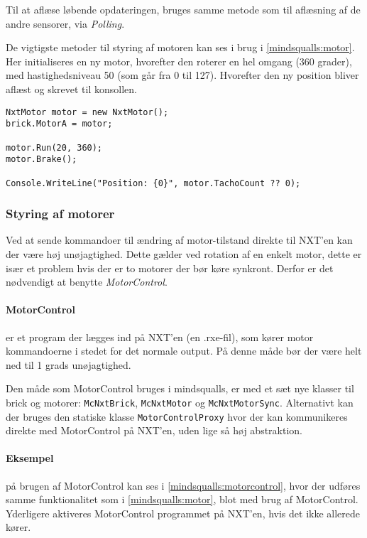 Til at aflæse løbende opdateringen, bruges samme metode som til aflæsning af de andre sensorer, via \textit{Polling}.

De vigtigste metoder til styring af motoren kan ses i brug i \cref{mindsqualls:motor}.
Her initialiseres en ny motor, hvorefter den roterer en hel omgang (360 grader), med hastighedsniveau 50 (som går fra 0 til 127).
Hvorefter den ny position bliver aflæst og skrevet til konsollen.

\begin{lstlisting}[style=csharpsmall,caption={Et eksempel på brug af en motor i \mindsqualls},label=mindsqualls:motor]
NxtMotor motor = new NxtMotor();
brick.MotorA = motor;

motor.Run(20, 360);
motor.Brake();

Console.WriteLine("Position: {0}", motor.TachoCount ?? 0);
\end{lstlisting}

\subsubsection{Styring af motorer}
Ved at sende kommandoer til ændring af motor-tilstand direkte til NXT'en kan der være høj unøjagtighed.
Dette gælder ved rotation af en enkelt motor, dette er især et problem hvis der er to motorer der bør køre synkront.
Derfor er det nødvendigt at benytte \textit{MotorControl}.

\paragraph{MotorControl} er et program der lægges ind på NXT'en (en .rxe-fil), som kører motor kommandoerne i stedet for det normale output.
På denne måde bør der være helt ned til 1 grads unøjagtighed.

Den måde som MotorControl bruges i mindsqualls, er med et sæt nye klasser til brick og motorer: \lstinline[style=csharp]!McNxtBrick!, \lstinline[style=csharp]!McNxtMotor! og \lstinline[style=csharp]!McNxtMotorSync!.
Alternativt kan der bruges den statiske klasse \lstinline[style=csharp]!MotorControlProxy! hvor der kan kommunikeres direkte med MotorControl på NXT'en, uden lige så høj abstraktion.

\paragraph{Eksempel} på brugen af MotorControl kan ses i \cref{mindsqualls:motorcontrol}, hvor der udføres samme funktionalitet som i \cref{mindsqualls:motor}, blot med brug af MotorControl.
Yderligere aktiveres MotorControl programmet på NXT'en, hvis det ikke allerede kører.

